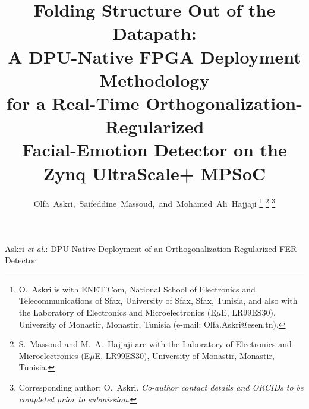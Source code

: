 \documentclass[onecolumn,journal]{IEEEtran}
\begin{document}
\title{Folding Structure Out of the Datapath:\\
A DPU-Native FPGA Deployment Methodology\\
for a Real-Time Orthogonalization-Regularized\\
Facial-Emotion Detector on the Zynq UltraScale+ MPSoC}

\author{Olfa~Askri,~Saifeddine~Massoud,~and~Mohamed~Ali~Hajjaji%
\thanks{O.~Askri is with ENET'Com, National School of Electronics and
Telecommunications of Sfax, University of Sfax, Sfax, Tunisia, and also with the
Laboratory of Electronics and Microelectronics (E$\mu$E, LR99ES30), University of
Monastir, Monastir, Tunisia (e-mail: Olfa.Askri@esen.tn).}%
\thanks{S.~Massoud and M.~A.~Hajjaji are with the Laboratory of Electronics and
Microelectronics (E$\mu$E, LR99ES30), University of Monastir, Monastir, Tunisia.}%
\thanks{Corresponding author: O.~Askri. \textit{Co-author contact details and ORCIDs to
be completed prior to submission.}}}

%
{Askri \MakeLowercase{\textit{et al.}}: DPU-Native Deployment of an Orthogonalization-Regularized FER Detector}

\maketitle
\end{document}
